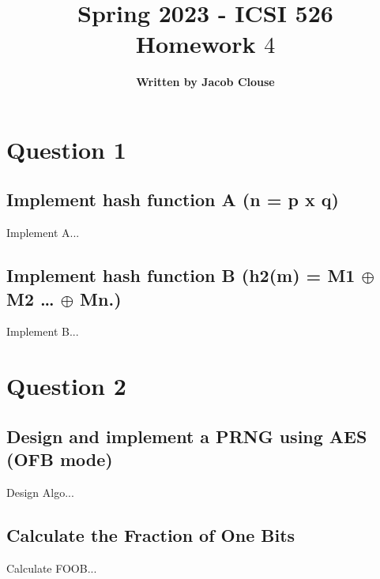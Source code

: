 \documentclass[10pt]{article}
\author{\vspace{0.2in}\textbf{Written by Jacob Clouse}}
\title{Spring 2023 - ICSI 526\\Homework $4$}
\begin{document}
\maketitle
\tableofcontents
\vspace{0.2in}

\section{Question 1}
\subsection{Implement hash function A (n = p x q)}
\noindent Implement A...

\vspace{0.2in}
\subsection{Implement hash function B (h2(m) = M1 $\oplus$ M2 … $\oplus$ Mn.)}
\noindent Implement B...







\vspace{0.2in}
\section{Question 2}
\subsection{Design and implement a PRNG using AES (OFB mode)}
\noindent Design Algo...


\subsection{Calculate the Fraction of One Bits} 
\noindent Calculate FOOB...

\vspace{0.2in}
\end{document}
